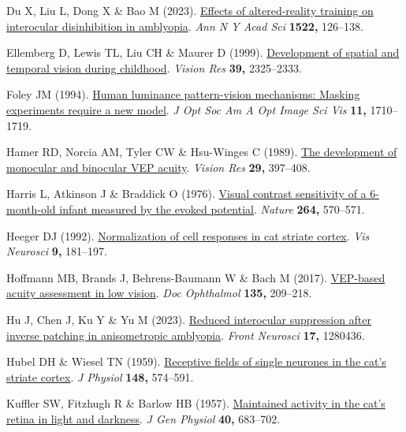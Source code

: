 \documentclass[
  letterpaper,
  DIV=11,
  numbers=noendperiod]{scrartcl}
\newlength{\cslhangindent}
\newenvironment{CSLReferences}[2] %
 {\begin{list}{}{%
  \setlength{\itemindent}{0pt}
  \setlength{\leftmargin}{0pt}
  \setlength{\parsep}{0pt}
  \ifodd #1
   \setlength{\leftmargin}{\cslhangindent}
   \setlength{\itemindent}{-1\cslhangindent}
  \fi
  \setlength{\itemsep}{#2\baselineskip}}}
 {\end{list}}
\begin{document}
\begin{CSLReferences}{1}{1}
Du X, Liu L, Dong X \& Bao M (2023).
\href{https://doi.org/10.1111/nyas.14969}{Effects of altered-reality
training on interocular disinhibition in amblyopia}. \emph{Ann N Y Acad
Sci} \textbf{1522,} 126--138.

Ellemberg D, Lewis TL, Liu CH \& Maurer D (1999).
\href{https://doi.org/10.1016/s0042-6989(98)00280-6}{Development of
spatial and temporal vision during childhood}. \emph{Vision Res}
\textbf{39,} 2325--2333.

Foley JM (1994). \href{https://doi.org/10.1364/josaa.11.001710}{Human
luminance pattern-vision mechanisms: Masking experiments require a new
model}. \emph{J Opt Soc Am A Opt Image Sci Vis} \textbf{11,} 1710--1719.

Hamer RD, Norcia AM, Tyler CW \& Hsu-Winges C (1989).
\href{https://doi.org/10.1016/0042-6989(89)90004-7}{The development of
monocular and binocular VEP acuity}. \emph{Vision Res} \textbf{29,}
397--408.

Harris L, Atkinson J \& Braddick O (1976).
\href{https://doi.org/10.1038/264570a0}{Visual contrast sensitivity of a
6-month-old infant measured by the evoked potential}. \emph{Nature}
\textbf{264,} 570--571.

Heeger DJ (1992).
\href{https://doi.org/10.1017/s0952523800009640}{Normalization of cell
responses in cat striate cortex}. \emph{Vis Neurosci} \textbf{9,}
181--197.

Hoffmann MB, Brands J, Behrens-Baumann W \& Bach M (2017).
\href{https://doi.org/10.1007/s10633-017-9613-y}{VEP-based acuity
assessment in low vision}. \emph{Doc Ophthalmol} \textbf{135,} 209--218.

Hu J, Chen J, Ku Y \& Yu M (2023).
\href{https://doi.org/10.3389/fnins.2023.1280436}{Reduced interocular
suppression after inverse patching in anisometropic amblyopia}.
\emph{Front Neurosci} \textbf{17,} 1280436.

Hubel DH \& Wiesel TN (1959).
\href{https://doi.org/10.1113/jphysiol.1959.sp006308}{Receptive fields
of single neurones in the cat's striate cortex}. \emph{J Physiol}
\textbf{148,} 574--591.

Kuffler SW, Fitzhugh R \& Barlow HB (1957).
\href{https://doi.org/10.1085/jgp.40.5.683}{Maintained activity in the
cat's retina in light and darkness}. \emph{J Gen Physiol} \textbf{40,}
683--702.


\end{CSLReferences}
\end{document}
